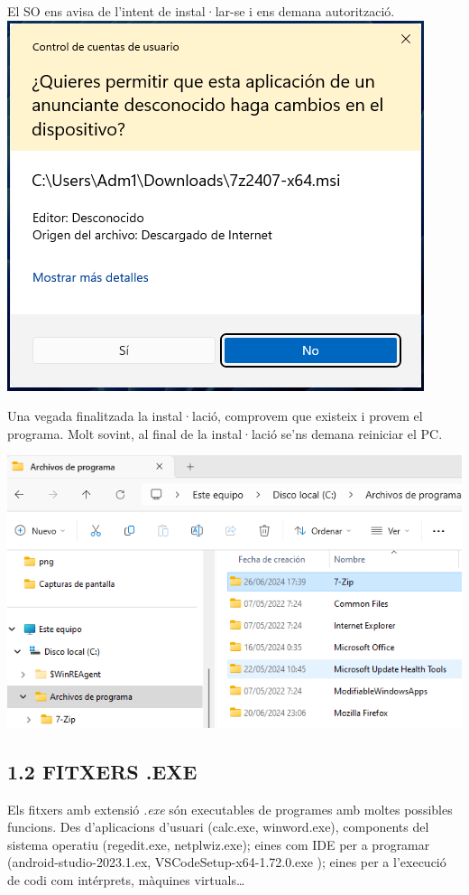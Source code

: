 \documentclass[
  a4paper,
]{article}
\begin{document}
El SO ens avisa de l'intent de instal·lar-se i ens demana autorització.
\includegraphics{png/instalarMSI4.png}

Una vegada finalitzada la instal·lació, comprovem que existeix i provem
el programa. Molt sovint, al final de la instal·lació se'ns demana
reiniciar el PC.

\includegraphics{png/instalarMSI5.png}

\subsection{1.2 FITXERS .EXE}\label{fitxers-.exe}

Els fitxers amb extensió \emph{.exe} són executables de programes amb
moltes possibles funcions. Des d'aplicacions d'usuari (calc.exe,
winword.exe), components del sistema operatiu (regedit.exe,
netplwiz.exe); eines com IDE per a programar (android-studio-2023.1.ex,
VSCodeSetup-x64-1.72.0.exe ); eines per a l'execució de codi com
intérprets, màquines virtuals\ldots{}
\end{document}

